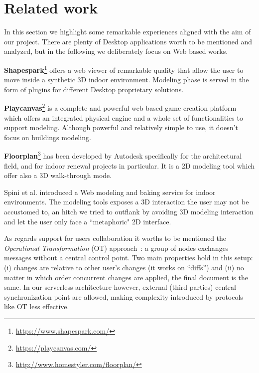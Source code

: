 \section{Related work}\label{sec:related_work}

In this section we highlight some remarkable experiences aligned with the aim of our project. There are plenty of Desktop applications worth to be mentioned and analyzed, but in the following we deliberately focus on Web based works. 

\textbf{Shapespark}\footnote{\url{https://www.shapespark.com/}} offers a web viewer of remarkable quality that allow the user to move inside a synthetic 3D indoor environment. Modeling phase is served in the form of plugins for different Desktop proprietary solutions.

\textbf{Playcanvas}\footnote{\url{https://playcanvas.com/}} is a complete and powerful web based game creation platform which offers an integrated physical engine and a whole set of functionalities to support modeling. Although powerful and relatively simple to use, it doesn't focus on buildings modeling.

\textbf{Floorplan}\footnote{\url{http://www.homestyler.com/floorplan/}} has been developed by Autodesk specifically for the architectural field, and for indoor renewal projects in particular. It is a 2D modeling tool which offer also a 3D walk-through mode.

Spini et al. \cite{Spini:2016:WIA:2945292.2945309} introduced a Web modeling and baking service for indoor environments. The modeling tools exposes a 3D interaction the user may not be accustomed to, an hitch we tried to outflank by avoiding 3D modeling interaction and let the user only face a ``metaphoric" 2D interface.

As regards support for users collaboration it worths to be mentioned the \emph{Operational Transformation} (OT) approach~\cite{Ellis:1989:CCG:66926.66963}: a group of nodes exchanges messages without a central control point. Two main properties hold in this setup: (i) changes are relative to other user's changes (it works on ``diffs'') and (ii) no matter in which order concurrent changes are applied, the final document is the same. In our serverless architecture however, external (third parties) central synchronization point are allowed, making complexity introduced by protocols like OT less effective.